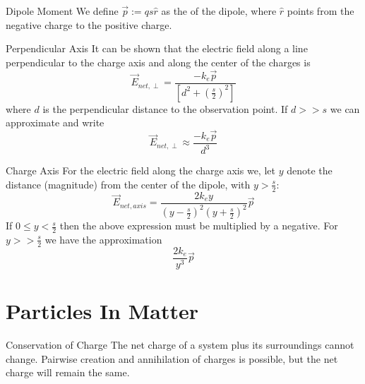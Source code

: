 \documentclass[12pt]{report}
\begin{document}
\begin{defn}{Dipole Moment}{}
        We define $\vec{p} := qs\hat{r}$ as the  of the dipole, where $\hat{r}$ points from the negative charge to the positive charge.
\end{defn}

\begin{prop}{Perpendicular Axis}{}
        It can be shown that the electric field along a line perpendicular to the charge axis and along the center of the charges is \begin{equation}
                \vec{E}_{net,\perp} = \frac{-k_e\vec{p}}{\left[d^2+\left(\frac{s}{2}\right)^2\right]}
        \end{equation}
        where $d$ is the perpendicular distance to the observation point. If $d >> s$ we can approximate and write \begin{equation}
                \vec{E}_{net,\perp} \approx \frac{-k_e\vec{p}}{d^3}
        \end{equation}
\end{prop}

\begin{prop}{Charge Axis}{}
        For the electric field along the charge axis we, let $y$ denote the distance (magnitude) from the center of the dipole, with $y > \frac{s}{2}$:  \begin{equation}
                \vec{E}_{net,axis} = \frac{2k_ey}{\left(y-\frac{s}{2}\right)^2\left(y+\frac{s}{2}\right)^2}\vec{p}
        \end{equation}
        If $0 \leq y < \frac{s}{2}$ then the above expression must be multiplied by a negative. For $y >> \frac{s}{2}$ we have the approximation \begin{equation}
                \frac{2k_e}{y^3}\vec{p}
        \end{equation}
\end{prop}




\section{Particles In Matter}

\begin{thm}{Conservation of Charge}{}
        The net charge of a system plus its surroundings cannot change. Pairwise creation and annihilation of charges is possible, but the net charge will remain the same.
\end{thm}
\end{document}
